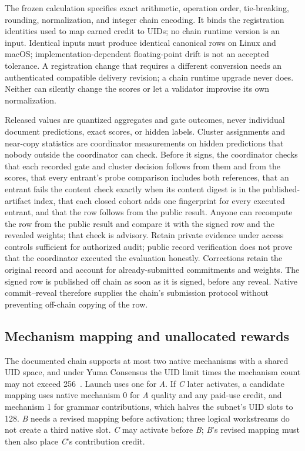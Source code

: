 The frozen calculation specifies exact arithmetic, operation order,
tie-breaking, rounding, normalization, and integer chain encoding. It binds the
registration identities used to map earned credit to UIDs; no chain runtime
version is an input. Identical inputs must produce identical canonical rows on
Linux and macOS; implementation-dependent floating-point drift is not an
accepted tolerance. A registration change that requires a different conversion
needs an authenticated compatible delivery revision; a chain runtime upgrade
never does. Neither can silently change the scores or let a validator improvise
its own normalization.

Released values are quantized aggregates and gate outcomes, never individual
document predictions, exact scores, or hidden labels. Cluster assignments and
near-copy statistics are coordinator measurements on hidden predictions that
nobody outside the coordinator can check. Before it signs, the coordinator checks that each
recorded gate and cluster decision follows from them and from the scores, that
every entrant's probe comparison includes both references, that an entrant
fails the content check exactly when its content digest is in the
published-artifact index, that each closed cohort adds one fingerprint for every
executed entrant, and that the row follows from the public result. Anyone can recompute the row from the public
result and compare it with the signed row and the revealed weights; that check
is advisory. Retain private evidence under access controls sufficient for
authorized audit; public record verification does not prove that the
coordinator executed the evaluation honestly. Corrections retain the original
record and account for already-submitted commitments and weights. The signed
row is published off chain as soon as it is signed, before any reveal. Native
commit--reveal therefore supplies the chain's submission protocol without
preventing off-chain copying of the row.

\subsection{Mechanism mapping and unallocated rewards}\label{unallocated-rewards}

The documented chain supports at most two native mechanisms with a shared UID
space, and under Yuma Consensus the UID limit times the mechanism count may not
exceed 256~\cite{mechanisms}. Launch uses one for \textit{A}. If \textit{C} later
activates, a candidate mapping uses native mechanism 0 for \textit{A} quality
and any paid-use credit, and mechanism 1 for grammar contributions, which
halves the subnet's UID slots to 128. \textit{B} needs a revised mapping before
activation; three logical workstreams do not create a third native slot.
\textit{C} may activate before \textit{B}; \textit{B}'s revised mapping must
then also place \textit{C}'s contribution credit.

